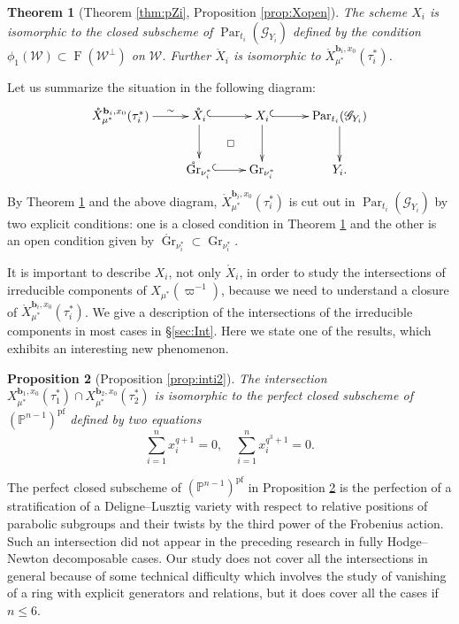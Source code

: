 \documentclass[12pt,a4paper]{article}
\newtheorem{thm}{Theorem}[section]
\newtheorem{prop}[thm]{Proposition}
\DeclareMathOperator{\Gr}{Gr}
\DeclareMathOperator{\Par}{Par}
\DeclareMathOperator{\oF}{F}
\newcommand{\bP}{\mathbb{P}}
\newcommand{\bfb}{\mathbf{b}}
\newcommand{\sG}{\mathscr{G}}
\newcommand{\sW}{\mathscr{W}}
\begin{document}
\begin{thm}[Theorem \ref{thm:pZi}, Proposition \ref{prop:Xopen}]\label{thm:IntpYi}
The scheme 
$X_i$ is isomorphic to the closed subscheme of 
$\Par_{t_i}(\sG_{Y_i})$ 
defined by the condition 
$\phi_1 (\sW) \subset \oF (\sW^{\perp})$ 
on $\sW$. 
Further $\mathring{X}_i$ is isomorphic to  $\mathring{X}_{\mu^*}^{\bfb_i,x_0}(\tau_i^*)$. 
\end{thm}

Let us summarize the situation in the following diagram: 
\[
 \xymatrix{
 \mathring{X}_{\mu^*}^{\bfb_i,x_0}(\tau_i^*)  \ar[r]^-{\sim}  & \mathring{X}_i         \ar[d] \ar@{^{(}->}[r] \ar@{}[dr]|\square & X_i \ar[d] \ar@{^{(}->}[r] &  \Par_{t_i}(\sG_{Y_i}) \ar[d] \\ 
  &  \mathring{\Gr}_{\nu_i^*} \ar@{^{(}->}[r]  & \Gr_{\nu_i^*} & Y_i .}
\]
By Theorem \ref{thm:IntpYi} and the above diagram, $\mathring{X}_{\mu^*}^{\bfb_i,x_0}(\tau_i^*)$ is cut out in $\Par_{t_i}(\sG_{Y_i})$ by two explicit conditions: one is a closed condition in Theorem \ref{thm:IntpYi} and the other is an open condition given by $\mathring{\Gr}_{\nu_i^*} \subset \Gr_{\nu_i^*}$. 

It is important to describe $X_i$, not only $\mathring{X}_i$, in order to study the intersections of irreducible components of $X_{\mu^*}(\varpi^{-1})$, because we need to understand a closure of $\mathring{X}_{\mu^*}^{\bfb_i,x_0}(\tau_i^*)$. 
We give a description of the intersections of the irreducible components in most cases in \S \ref{sec:Int}. 
Here we state one of the results, which exhibits an interesting new phenomenon. \begin{prop}[Proposition \ref{prop:inti2}]\label{prop:int12i}
The intersection 
$X_{\mu^*}^{\bfb_1,x_0}(\tau_1^*) \cap X_{\mu^*}^{\bfb_2,x_0}(\tau_2^*)$ 
is isomorphic to  
the perfect closed subscheme of $(\bP^{n-1})^{\mathrm{pf}}$ defined by two equations 
\[
 \sum_{i=1}^n x_i^{q+1}=0, \quad 
 \sum_{i=1}^n x_i^{q^3+1}=0. 
\]
\end{prop}
The perfect closed subscheme of $(\bP^{n-1})^{\mathrm{pf}}$ in 
Proposition \ref{prop:int12i} 
is the perfection of 
a stratification of a 
Deligne--Lusztig variety 
with respect to relative positions of 
parabolic subgroups and their twists 
by the third power of the Frobenius action. 
Such an intersection did not appear in the 
preceding research in 
fully Hodge--Newton decomposable cases. 
Our study does not cover all the intersections in general 
because of some technical difficulty 
which involves the study of vanishing of a ring with explicit generators and relations, 
but it does cover all the cases if $n \leq 6$. 
\end{document}
